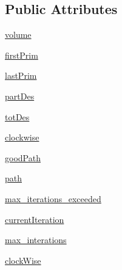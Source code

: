 \subsection*{Public Attributes}
\begin{DoxyCompactItemize}
\item 
\hyperlink{classdestruction_1_1_path_back_tracking_1_1_path_back_tracking_ac87cd9b169c234775db8defbae19b911}{volume}
\item 
\hyperlink{classdestruction_1_1_path_back_tracking_1_1_path_back_tracking_a03012ea004fe8b3905e239dd195a1d1a}{first\-Prim}
\item 
\hyperlink{classdestruction_1_1_path_back_tracking_1_1_path_back_tracking_a1194cfded9552d93ba49cc5df4cbfaa9}{last\-Prim}
\item 
\hyperlink{classdestruction_1_1_path_back_tracking_1_1_path_back_tracking_a0d25f02ba62be6a13d2c4a43c2b92a91}{part\-Des}
\item 
\hyperlink{classdestruction_1_1_path_back_tracking_1_1_path_back_tracking_a78382625f0c3b6aa4936211b24c4215d}{tot\-Des}
\item 
\hyperlink{classdestruction_1_1_path_back_tracking_1_1_path_back_tracking_a1c7b3e474f1e4d19e0a881e002d92b9e}{clockwise}
\item 
\hyperlink{classdestruction_1_1_path_back_tracking_1_1_path_back_tracking_a7fa5ef9d1df56ee976a68e8d3ba09189}{good\-Path}
\item 
\hyperlink{classdestruction_1_1_path_back_tracking_1_1_path_back_tracking_a529cdde26c1398a91eeb92c2cef5b871}{path}
\item 
\hyperlink{classdestruction_1_1_path_back_tracking_1_1_path_back_tracking_a1484257fa682ad736dd3fb6e2c61a2ba}{max\-\_\-iterations\-\_\-exceeded}
\item 
\hyperlink{classdestruction_1_1_path_back_tracking_1_1_path_back_tracking_afd4aa7c7945cc04052bad4a9191e046b}{current\-Iteration}
\item 
\hyperlink{classdestruction_1_1_path_back_tracking_1_1_path_back_tracking_a71cb834f1b0d30ae1ab3271ec842ad75}{max\-\_\-interations}
\item 
\hyperlink{classdestruction_1_1_path_back_tracking_1_1_path_back_tracking_a3dfce3cabbce4325192ccae1ba98e0cb}{clock\-Wise}
\end{DoxyCompactItemize}


